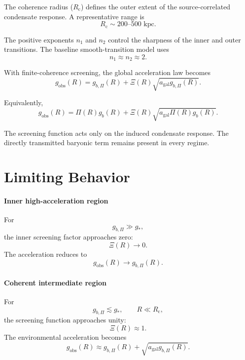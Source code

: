 The coherence radius ($R_{\mathrm{c}}$) defines the outer extent of the source-correlated condensate response. A representative range is
\begin{equation}
    R_{\mathrm{c}} \sim 200\text{--}500 \text{ kpc}.
\end{equation}

The positive exponents $n_1$ and $n_2$ control the sharpness of the inner and outer transitions. The baseline smooth-transition model uses
\begin{equation}
    n_1 \approx n_2 \approx 2.
\end{equation}

With finite-coherence screening, the global acceleration law becomes
\begin{equation}
    g_{\mathrm{obs}}(R) = g_{b,\Pi}(R) + \Xi(R) \sqrt{ a_{\mathrm{gal}}g_{b,\Pi}(R) }.
\end{equation}

Equivalently,
\begin{equation}
    g_{\mathrm{obs}}(R) = \Pi(R)g_b(R) + \Xi(R) \sqrt{ a_{\mathrm{gal}}\Pi(R)g_b(R) }.
\end{equation}

The screening function acts only on the induced condensate response. The directly transmitted baryonic term remains present in every regime.

\section{Limiting Behavior}

\paragraph{Inner high-acceleration region}
For
\begin{equation}
    g_{b,\Pi} \gg g_*,
\end{equation}
the inner screening factor approaches zero:
\begin{equation}
    \Xi(R) \rightarrow 0.
\end{equation}
The acceleration reduces to
\begin{equation}
    g_{\mathrm{obs}}(R) \rightarrow g_{b,\Pi}(R).
\end{equation}

\paragraph{Coherent intermediate region}
For
\begin{equation}
    g_{b,\Pi} \lesssim g_*, \qquad R \ll R_{\mathrm{c}},
\end{equation}
the screening function approaches unity:
\begin{equation}
    \Xi(R) \approx 1.
\end{equation}
The environmental acceleration becomes
\begin{equation}
    g_{\mathrm{obs}}(R) \approx g_{b,\Pi}(R) + \sqrt{ a_{\mathrm{gal}}g_{b,\Pi}(R) }.
\end{equation}

